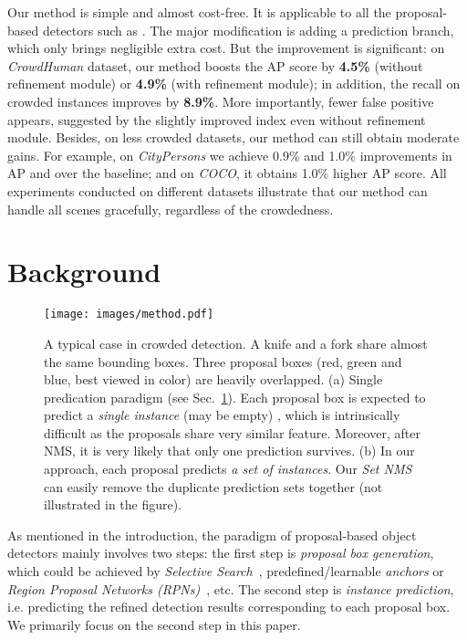 \documentclass[10pt,twocolumn,letterpaper]{article}
\begin{document}
Our method is simple and almost cost-free. It is applicable to all the proposal-based detectors such as \cite{ren2015faster,lin2017feature,lin2017focal,he2017mask}. The major modification is adding a prediction branch, which only brings negligible extra cost. But the improvement is significant: on \emph{CrowdHuman} \cite{shao2018crowdhuman} dataset, our method boosts the AP score by \textbf{4.5\%} (without refinement module) or \textbf{4.9\%} (with refinement module); in addition, the recall on crowded instances improves by \textbf{8.9\%}. More importantly, fewer false positive appears, suggested by the slightly improved  index even without refinement module. Besides, on less crowded datasets, our method can still obtain moderate gains. For example, on \emph{CityPersons} we achieve 0.9\% and 1.0\% improvements in AP and  over the baseline; and on \emph{COCO}, \cite{lin2014microsoft} it obtains 1.0\% higher AP score. All experiments conducted on different datasets illustrate that our method can handle all scenes gracefully, regardless of the crowdedness.

\section{Background}
\label{sec:limitations}

\begin{figure}[t]
	\begin{center}
		\texttt{[image: images/method.pdf]}
	\end{center}
	\caption{A typical case in crowded detection. A knife and a fork share almost the same bounding boxes. Three proposal boxes (red, green and blue, best viewed in color) are heavily overlapped. (a) Single predication paradigm (see Sec.~\ref{sec:limitations}). Each proposal box is expected to predict a \emph{single instance} \cite{ren2015faster,lin2017feature,lin2017focal,liu2016ssd,yolov3,he2017mask} (may be empty) , which is intrinsically difficult as the proposals share very similar feature. Moreover, after NMS, it is very likely that only one prediction survives. (b) In our approach, each proposal predicts \emph{a set of instances}. Our \emph{Set NMS} can easily remove the duplicate prediction sets together (not illustrated in the figure).}
	\label{fig:method}
\end{figure}

As mentioned in the introduction, the paradigm of proposal-based object detectors mainly involves two steps: the first step is \emph{proposal box generation}, which could be achieved by \emph{Selective Search}~\cite{girshick2014rich,girshick2015fast}, predefined/learnable \emph{anchors} \cite{ren2015faster,yolov3,liu2016ssd,lin2017focal,yang2018metaanchor,wang2019region,zhong2019cascade} or \emph{Region Proposal Networks (RPNs)}~\cite{ren2015faster,lin2017feature,he2017mask,dai2016rfcn,cai2019cascadercnn}, etc. The second step is \emph{instance prediction}, i.e. predicting the refined detection results corresponding to each proposal box. We primarily focus on the second step in this paper.
\end{document}
